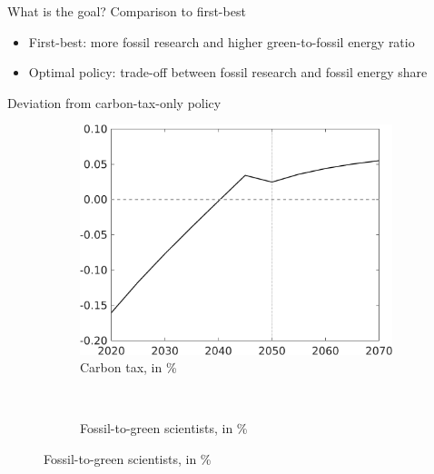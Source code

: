 \documentclass[11pt,aspectratio=169]{beamer}
\begin{document}
\begin{frame}{What is the goal? Comparison to first-best}
\begin{figure}[h!!]
\end{figure}
\pause
\vspace{3mm}
\begin{block}{}
	\begin{itemize}
\item<+-> First-best: more fossil research and higher green-to-fossil energy ratio
\item<+-> Optimal policy: trade-off between fossil research and fossil energy share
	\end{itemize}
\end{block}	
\end{frame}

\begin{frame}{Deviation from carbon-tax-only policy}
	\pause
	\centering
	\begin{figure}
	\begin{subfigure}{0.4\textwidth}
	\caption{\normalsize{Carbon tax, in \%}}
	\includegraphics[width=1\textwidth]{../codding_model/own_basedOnFried/optimalPol_010922_revision/figures/all_13Sept22_Tplus30/Tauf_OPT_T_NoTaus_COMPtaulPer_regime4_spillover0_knspil0_noskill0_sep0_xgrowth0_PV1_etaa0.79.png}
\end{subfigure}
\begin{minipage}[]{0.1\textwidth}
	\
\end{minipage}
\begin{subfigure}{0.4\textwidth}
	\caption{\normalsize{Fossil-to-green scientists,  in \% }}

\end{subfigure}
\end{figure}
\end{frame}
\end{document}
